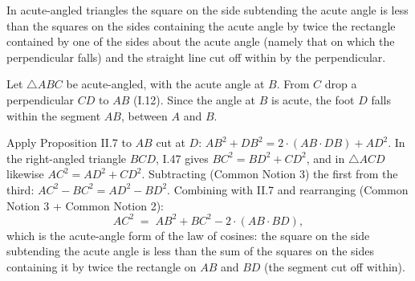 \begin{claim}
\label{prop:II.13}
In acute-angled triangles the square on the side subtending the acute
angle is less than the squares on the sides containing the acute
angle by twice the rectangle contained by one of the sides about the
acute angle (namely that on which the perpendicular falls) and the
straight line cut off within by the perpendicular.
\end{claim}
\begin{evidence}[Proof of II.13]
\label{ev:II.13}
Let $\triangle ABC$ be acute-angled, with the acute angle at $B$.
From $C$ drop a perpendicular $CD$ to $AB$ (I.12).  Since the angle
at $B$ is acute, the foot $D$ falls within the segment $AB$, between
$A$ and $B$.

Apply Proposition II.7 to $AB$ cut at $D$: $AB^2 + DB^2 = 2\cdot
(AB \cdot DB) + AD^2$.  In the right-angled triangle $BCD$, I.47
gives $BC^2 = BD^2 + CD^2$, and in $\triangle ACD$ likewise
$AC^2 = AD^2 + CD^2$.  Subtracting (Common Notion 3) the first
from the third: $AC^2 - BC^2 = AD^2 - BD^2$.  Combining with II.7
and rearranging (Common Notion 3 + Common Notion 2):
\[
    AC^2 \;=\; AB^2 + BC^2 - 2\cdot(AB \cdot BD),
\]
which is the acute-angle form of the law of cosines: the square on
the side subtending the acute angle is less than the sum of the
squares on the sides containing it by twice the rectangle on $AB$
and $BD$ (the segment cut off within).
\end{evidence}

